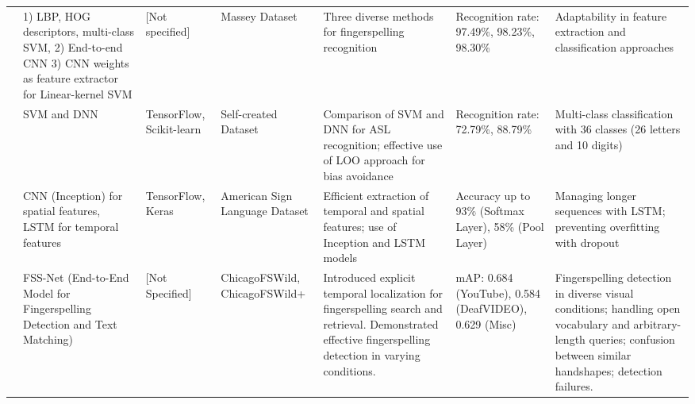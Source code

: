 \begin{footnotesize}
\begin{longtable}{LLLLLLL}
        \cite{nguyenDeepLearningAmerican2019}              & 1) LBP, HOG descriptors, multi-class SVM, 2) End-to-end CNN 3) CNN weights as feature extractor for Linear-kernel SVM & [Not specified]          & Massey Dataset                 & Three diverse methods for fingerspelling recognition                                                                                                      & Recognition rate: 97.49\%, 98.23\%, 98.30\%            & Adaptability in feature extraction and classification approaches                                                                                                        \\

        \cite{chongAmericanSignLanguage2018}               & SVM and DNN                                                                                                           & TensorFlow, Scikit-learn & Self-created Dataset           & Comparison of SVM and DNN for ASL recognition; effective use of LOO approach for bias avoidance                                                           & Recognition rate: 72.79\%, 88.79\%                     & Multi-class classification with 36 classes (26 letters and 10 digits)                                                                                                   \\

        \cite{bantupalliAmericanSignLanguage2018}          & CNN (Inception) for spatial features, LSTM for temporal features                                                      & TensorFlow, Keras        & American Sign Language Dataset & Efficient extraction of temporal and spatial features; use of Inception and LSTM models                                                                   & Accuracy up to 93\% (Softmax Layer), 58\% (Pool Layer) & Managing longer sequences with LSTM; preventing overfitting with dropout                                                                                                \\

        \cite{shiSearchingFingerspelledContent2022}        & FSS-Net (End-to-End Model for Fingerspelling Detection and Text Matching)                                             & [Not Specified]          & ChicagoFSWild, ChicagoFSWild+  & Introduced explicit temporal localization for fingerspelling search and retrieval. Demonstrated effective fingerspelling detection in varying conditions. & mAP: 0.684 (YouTube), 0.584 (DeafVIDEO), 0.629 (Misc)  & Fingerspelling detection in diverse visual conditions; handling open vocabulary and arbitrary-length queries; confusion between similar handshapes; detection failures. \\


\end{longtable}
\end{footnotesize}
